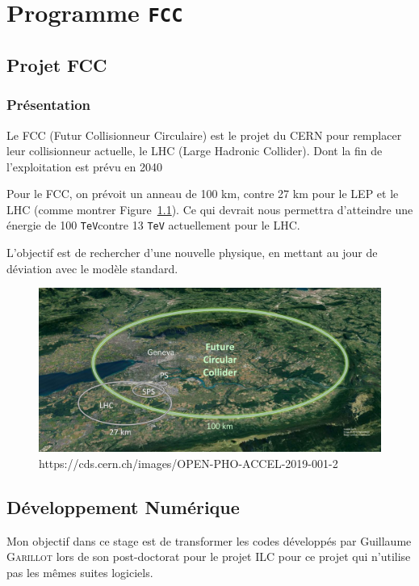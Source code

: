 \documentclass[10pt,a4paper]{report}
\newcommand{\TeV}{\texttt{TeV}}
\begin{document}

\chapter{Programme \texttt{FCC}}

\section{Projet FCC}

\subsection{Présentation}

Le FCC (Futur Collisionneur Circulaire) est le projet du CERN pour remplacer 
leur collisionneur actuelle, le LHC (Large Hadronic Collider). 
Dont la fin de l'exploitation est prévu en 2040 \cite{cern:fcc}

Pour le FCC, on prévoit un anneau de 100 km, contre 27 km pour le LEP et le LHC 
(comme montrer Figure~\ref{fcc:img}).
Ce qui devrait nous permettra d'atteindre une énergie de 100 \TeV contre 13 \TeV
actuellement pour le LHC.

L'objectif est de rechercher d'une nouvelle physique, en mettant au jour de 
déviation avec le modèle standard.


\begin{figure}[h!]
    \centering
    \includegraphics[width=\textwidth]{../img/FCC.jpg}
    \caption{https://cds.cern.ch/images/OPEN-PHO-ACCEL-2019-001-2}
    \label{fcc:img}
\end{figure}

\section{Développement Numérique}

Mon objectif dans ce stage est de transformer les codes développés par Guillaume 
\textsc{Garillot} lors de son post-doctorat pour le projet ILC pour ce projet 
qui n'utilise pas les mêmes suites logiciels.
\end{document}
